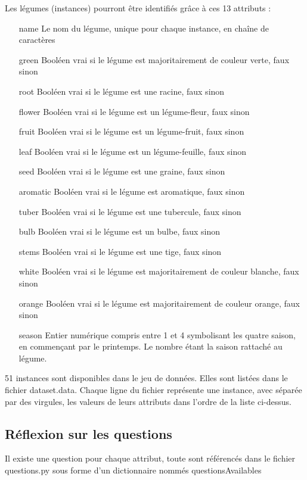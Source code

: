 \documentclass{report}
\begin{document}
Les légumes (instances) pourront être identifiés grâce à ces 13 attributs : 
\begin{enumerate}
    \item[name] Le nom du légume, unique pour chaque instance, en chaîne de caractères
    \item[green] Booléen vrai si le légume est majoritairement de couleur verte, faux sinon
    \item[root] Booléen vrai si le légume est une racine, faux sinon
    \item[flower] Booléen vrai si le légume est un légume-fleur, faux sinon
    \item[fruit] Booléen vrai si le légume est un légume-fruit, faux sinon
    \item[leaf] Booléen vrai si le légume est un légume-feuille, faux sinon
    \item[seed] Booléen vrai si le légume est une graine, faux sinon
    \item[aromatic] Booléen vrai si le légume est aromatique, faux sinon
    \item[tuber] Booléen vrai si le légume est une tubercule, faux sinon
    \item[bulb] Booléen vrai si le légume est un bulbe, faux sinon
    \item[stems] Booléen vrai si le légume est une tige, faux sinon
    \item[white] Booléen vrai si le légume est majoritairement de couleur blanche, faux sinon
    \item[orange] Booléen vrai si le légume est majoritairement de couleur orange, faux sinon 
    \item[season] Entier numérique compris entre 1 et 4 symbolisant les quatre saison, en commençant par le printemps. Le nombre étant la saison rattaché au légume. 
\end{enumerate}

51 instances sont disponibles dans le jeu de données. Elles sont listées dans le fichier dataset.data. Chaque ligne du fichier représente une instance, avec séparée par des virgules, les valeurs de leurs attributs dans l'ordre de la liste ci-dessus.

\subsection{Réflexion sur les questions}

Il existe une question pour chaque attribut, toute sont référencés dans le fichier questions.py sous forme d'un dictionnaire nommés questionsAvailables
\end{document}
